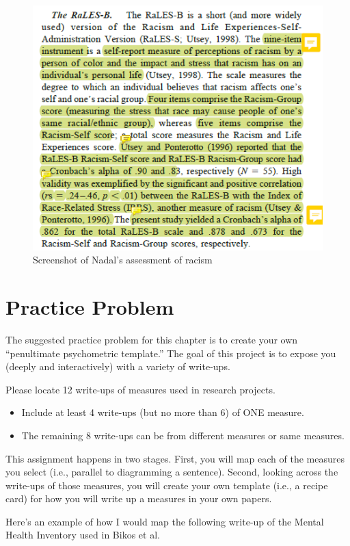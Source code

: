 \documentclass[
  english,
]{book}
\providecommand{\tightlist}{%
  \setlength{\itemsep}{0pt}\setlength{\parskip}{0pt}}
\begin{document}
\begin{figure}
\centering
\includegraphics{images/PsychoM/Nadal1.png}
\caption{Screenshot of Nadal's assessment of racism}
\end{figure}

\hypertarget{practice-problem}{%
\section{Practice Problem}\label{practice-problem}}

The suggested practice problem for this chapter is to create your own ``penultimate psychometric template.'' The goal of this project is to expose you (deeply and interactively) with a variety of write-ups.

Please locate 12 write-ups of measures used in research projects.

\begin{itemize}
\tightlist
\item
  Include at least 4 write-ups (but no more than 6) of ONE measure.
\item
  The remaining 8 write-ups can be from different measures or same measures.
\end{itemize}

This assignment happens in two stages. First, you will map each of the measures you select (i.e., parallel to diagramming a sentence). Second, looking across the write-ups of those measures, you will create your own template (i.e., a recipe card) for how you will write up a measures in your own papers.

Here's an example of how I would map the following write-up of the Mental Health Inventory used in Bikos et al. \citeyearpar{bikos_repeated_2007}
\end{document}
